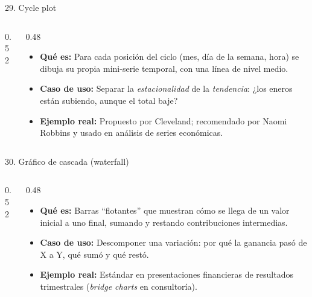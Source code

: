 \documentclass[aspectratio=169,9pt]{beamer}
\newcommand{\ficha}[3]{%
\begin{itemize}
\item \textbf{Qué es:} #1
\item \textbf{Caso de uso:} #2
\item \textbf{Ejemplo real:} #3
\end{itemize}}
\begin{document}
\begin{frame}{29. Cycle plot}
\begin{columns}[T]
\begin{column}{0.52\textwidth}
\centering
{}
\end{column}
\begin{column}{0.48\textwidth}
\ficha{Para cada posición del ciclo (mes, día de la semana, hora) se dibuja su propia mini-serie temporal, con una línea de nivel medio.}
{Separar la \emph{estacionalidad} de la \emph{tendencia}: ¿los eneros están subiendo, aunque el total baje?}
{Propuesto por Cleveland; recomendado por Naomi Robbins y usado en análisis de series económicas.}
\end{column}
\end{columns}
\end{frame}

\begin{frame}{30. Gráfico de cascada (waterfall)}
\begin{columns}[T]
\begin{column}{0.52\textwidth}
\centering
{}
\end{column}
\begin{column}{0.48\textwidth}
\ficha{Barras ``flotantes'' que muestran cómo se llega de un valor inicial a uno final, sumando y restando contribuciones intermedias.}
{Descomponer una variación: por qué la ganancia pasó de X a Y, qué sumó y qué restó.}
{Estándar en presentaciones financieras de resultados trimestrales (\emph{bridge charts} en consultoría).}
\end{column}
\end{columns}
\end{frame}
\end{document}
